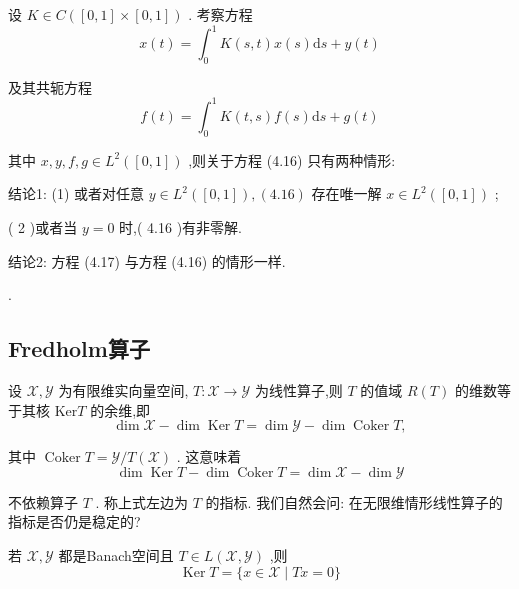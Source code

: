 \documentclass[lang=cn,newtx,10pt,scheme=chinese,thmcnt=chapter]{elegantbook}
\newcommand{\dif}{\mathrm{d}}
\begin{document}
\begin{example}
    设 \(K \in  C\left( {\left\lbrack  {0,1}\right\rbrack   \times  \left\lbrack  {0,1}\right\rbrack  }\right)\) . 考察方程
\begin{equation*}
x\left( t\right)  = {\int }_{0}^{1}K\left( {s,t}\right) x\left( s\right) {\dif s} + y\left( t\right)  \label{4.16}
\end{equation*}

及其共轭方程
\begin{equation*}
f\left( t\right)  = {\int }_{0}^{1}K\left( {t,s}\right) f\left( s\right) {\dif s} + g\left( t\right)  \label{4.17}
\end{equation*}

其中 \(x,y,f,g \in  {L}^{2}\left( \left\lbrack  {0,1}\right\rbrack  \right)\) ,则关于方程 (4.16) 只有两种情形:

结论1: (1) 或者对任意 \(y \in  {L}^{2}\left( \left\lbrack  {0,1}\right\rbrack  \right) ,\left( {4.16}\right)\) 存在唯一解 \(x \in  {L}^{2}\left( \left\lbrack  {0,1}\right\rbrack  \right)\) ;

( 2 )或者当 \(y = 0\) 时,( 4.16 )有非零解.

结论2: 方程 (4.17) 与方程 (4.16) 的情形一样.
\end{example}.


\subsection{Fredholm算子}

设 \(\mathcal{X},\mathcal{Y}\) 为有限维实向量空间, \(T : \mathcal{X} \rightarrow  \mathcal{Y}\) 为线性算子,则 \(T\) 的值域 \(R\left( T\right)\) 的维数等于其核 \(\mathrm{{Ker}}T\) 的余维,即
\begin{equation*}
\dim \mathcal{X} - \dim \operatorname{Ker}T = \dim \mathcal{Y} - \dim \operatorname{Coker}T,
\end{equation*}

其中 \(\operatorname{Coker}T = \mathcal{Y}/T\left( \mathcal{X}\right)\) . 这意味着
\begin{equation*}
\dim \operatorname{Ker}T - \dim \operatorname{Coker}T = \dim \mathcal{X} - \dim \mathcal{Y}
\end{equation*}

不依赖算子 \(T\) . 称上式左边为 \(T\) 的指标. 我们自然会问: 在无限维情形线性算子的指标是否仍是稳定的?

若 \(\mathcal{X},\mathcal{Y}\) 都是Banach空间且 \(T \in  L\left( {\mathcal{X},\mathcal{Y}}\right)\) ,则
\begin{equation*}
\operatorname{Ker}T = \{ x \in  \mathcal{X} \mid  {Tx} = 0\}
\end{equation*}
\end{document}

